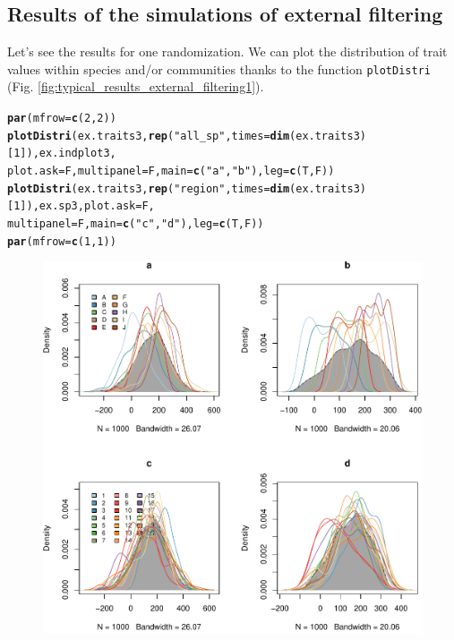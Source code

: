 \documentclass[12pt]{article}\usepackage[]{graphicx}\usepackage[]{color}
\makeatletter
\def\maxwidth{ %
  \ifdim\Gin@nat@width>\linewidth
    \linewidth
  \else
    \Gin@nat@width
  \fi
}
\newcommand{\hlnum}[1]{\textcolor[rgb]{0.686,0.059,0.569}{#1}}%
\newcommand{\hlstr}[1]{\textcolor[rgb]{0.192,0.494,0.8}{#1}}%
\newcommand{\hlstd}[1]{\textcolor[rgb]{0.345,0.345,0.345}{#1}}%
\newcommand{\hlkwc}[1]{\textcolor[rgb]{0.333,0.667,0.333}{#1}}%
\newcommand{\hlkwd}[1]{\textcolor[rgb]{0.737,0.353,0.396}{\textbf{#1}}}%
\newenvironment{kframe}{%
 \def\at@end@of@kframe{}%
 \ifinner\ifhmode%
  \def\at@end@of@kframe{\end{minipage}}%
  \begin{minipage}{\columnwidth}%
 \fi\fi%
 \def\FrameCommand##1{\hskip\@totalleftmargin \hskip-\fboxsep
 \colorbox{shadecolor}{##1}\hskip-\fboxsep
     \hskip-\linewidth \hskip-\@totalleftmargin \hskip\columnwidth}%
 \MakeFramed {\advance\hsize-\width
   \@totalleftmargin\z@ \linewidth\hsize
   \@setminipage}}%
 {\par\unskip\endMakeFramed%
 \at@end@of@kframe}
\newenvironment{knitrout}{}{} %
\makeatother
\begin{document}
 \subsection {Results of the simulations of external filtering}

Let's see the results for one randomization. We can plot the distribution of trait values within species and/or communities thanks to the function \texttt{plotDistri} (Fig. \ref{fig:typical_results_external_filtering1}). 

\begin{knitrout}\small
{}\color{fgcolor}\begin{kframe}
\begin{alltt}
\hlkwd{par}\hlstd{(}\hlkwc{mfrow}\hlstd{=}\hlkwd{c}\hlstd{(}\hlnum{2}\hlstd{,} \hlnum{2}\hlstd{))}
\hlkwd{plotDistri}\hlstd{(ex.traits3,} \hlkwd{rep}\hlstd{(}\hlstr{"all_sp"}\hlstd{,} \hlkwc{times} \hlstd{=} \hlkwd{dim}\hlstd{(ex.traits3)[}\hlnum{1}\hlstd{]), ex.indplot3,}
           \hlkwc{plot.ask} \hlstd{= F,} \hlkwc{multipanel} \hlstd{= F,} \hlkwc{main} \hlstd{=} \hlkwd{c}\hlstd{(}\hlstr{"a"}\hlstd{,} \hlstr{"b"}\hlstd{),} \hlkwc{leg} \hlstd{=} \hlkwd{c}\hlstd{(T, F))}
\hlkwd{plotDistri}\hlstd{(ex.traits3,} \hlkwd{rep}\hlstd{(}\hlstr{"region"}\hlstd{,} \hlkwc{times} \hlstd{=} \hlkwd{dim}\hlstd{(ex.traits3)[}\hlnum{1}\hlstd{]), ex.sp3,} \hlkwc{plot.ask} \hlstd{= F,}
           \hlkwc{multipanel} \hlstd{= F,} \hlkwc{main} \hlstd{=} \hlkwd{c}\hlstd{(}\hlstr{"c"}\hlstd{,} \hlstr{"d"}\hlstd{),} \hlkwc{leg} \hlstd{=} \hlkwd{c}\hlstd{(T, F))}
\hlkwd{par}\hlstd{(}\hlkwc{mfrow}\hlstd{=}\hlkwd{c}\hlstd{(}\hlnum{1}\hlstd{,} \hlnum{1}\hlstd{))}
\end{alltt}
\end{kframe}\begin{figure}

{\centering \includegraphics[width=\maxwidth]{figure/typical_results_external_filtering1-1} 

}
\end{figure}
\end{knitrout}
\end{document}
